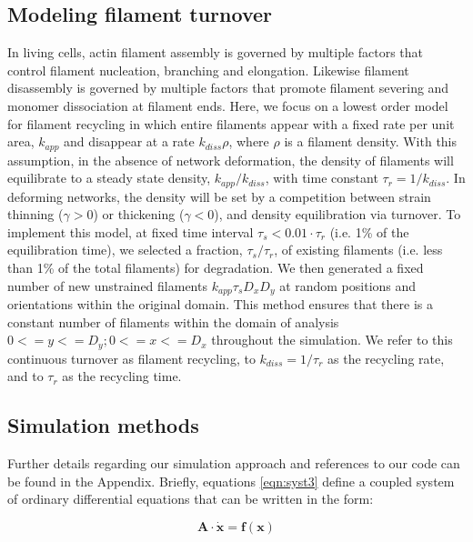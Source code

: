 \documentclass[10pt,letterpaper]{article}
\begin{document}
\subsection*{Modeling filament turnover}

In living cells, actin filament assembly is governed by multiple factors that control filament nucleation, branching and elongation. Likewise filament disassembly is governed by multiple factors that promote filament severing and monomer dissociation at filament ends. Here, we focus on a lowest order model for filament recycling in which entire filaments appear with a fixed rate per unit area, $k_{app}$ and disappear at a rate $k_{diss}\rho$, where $\rho$ is a filament density. With this assumption, in the absence of network deformation, the density of filaments will equilibrate to a steady state density, $k_{app}/k_{diss}$, with time constant $\tau_r = 1/k_{diss}$.   In deforming networks, the density will be set by a competition between strain thinning ($\gamma>0$) or thickening ($\gamma<0$), and density equilibration via turnover. To implement this model, at fixed time interval $\tau_s < 0.01\cdot\tau_r$ (i.e. 1\% of the equilibration time), we selected a fraction, $\tau_s/\tau_r$, of existing filaments (i.e. less than 1\% of the total filaments) for degradation. We then generated a fixed number of new unstrained filaments $k_{app}\tau_sD_xD_y$ at random positions and orientations within the original domain.   This method ensures that there is a constant number of filaments within the domain of analysis $0<=y<=D_y; 0<=x<=D_x$ throughout the simulation. We refer to this continuous turnover as filament recycling, to $k_{diss}=1/\tau_r$ as the recycling rate, and to $\tau_r$ as the recycling time.


\subsection*{Simulation methods}

Further details regarding our simulation approach and references to our code can be found in the Appendix. Briefly, equations  \ref{eqn:syst3} define a coupled system of ordinary differential equations that can be written in the form:

\begin{equation}
\mathbf{A \cdot \dot x} = \mathbf{f(x)}
\end{equation}
\end{document}
